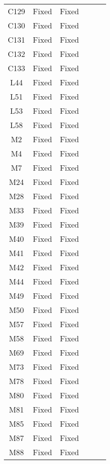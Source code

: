 \begin{table}[!t]
{\begin{tabular}{|c|c|c|c|c|c|}
C129              & Fixed     &Fixed   \\
C130              & Fixed     &Fixed   \\
C131              & Fixed     &Fixed   \\
C132              & Fixed     &Fixed   \\
C133              & Fixed     &Fixed   \\
\hline
L44               & Fixed     &Fixed   \\
L51               & Fixed     &Fixed   \\
L53               & Fixed     &Fixed   \\
L58               & Fixed     &Fixed   \\
\hline
M2                & Fixed     &Fixed   \\
M4                & Fixed     &Fixed   \\
M7                & Fixed     &Fixed   \\
M24               & Fixed     &Fixed   \\
M28               & Fixed     &Fixed   \\
M33               & Fixed     &Fixed   \\
M39               & Fixed     &Fixed   \\
M40               & Fixed     &Fixed   \\
M41               & Fixed     &Fixed   \\
M42               & Fixed     &Fixed   \\
M44               & Fixed     &Fixed   \\
M49               & Fixed     &Fixed   \\
M50               & Fixed     &Fixed   \\
M57               & Fixed     &Fixed   \\
M58               & Fixed     &Fixed   \\
M69               & Fixed     &Fixed   \\
M73               & Fixed     &Fixed   \\
M78               & Fixed     &Fixed   \\
M80               & Fixed     &Fixed   \\
M81               & Fixed     &Fixed   \\
M85               & Fixed     &Fixed   \\
M87               & Fixed     &Fixed   \\
M88               & Fixed     &Fixed   \\

\end{tabular}}
\end{table}
